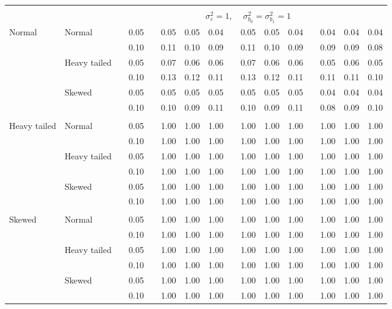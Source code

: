 \begin{table}[ht]
\begin{scriptsize}
\begin{tabular}{ll p{.1cm} c p{.1cm} rrr p{.1cm} rrr p{.1cm} rrr}
&&&&&&&&&&&&&&&\\
& && && \multicolumn{9}{c}{$\sigma_{\varepsilon}^2 = 1$, \ \ $\sigma_{b_0}^2 = \sigma_{b_1}^2 = 1$} \\ \cline{6-16}

\rowcolor{gray!20} Normal       & Normal       && 0.05 &&  0.05 & 0.05 & 0.04 && 0.05 & 0.05 & 0.04 && 0.04 & 0.04 & 0.04 \\ 
\rowcolor{gray!20}              &              && 0.10 &&  0.11 & 0.10 & 0.09 && 0.11 & 0.10 & 0.09 && 0.09 & 0.09 & 0.08 \\ 
\rowcolor{gray!20}              & Heavy tailed && 0.05 &&  0.07 & 0.06 & 0.06 && 0.07 & 0.06 & 0.06 && 0.05 & 0.06 & 0.05 \\ 
\rowcolor{gray!20}              &              && 0.10 &&  0.13 & 0.12 & 0.11 && 0.13 & 0.12 & 0.11 && 0.11 & 0.11 & 0.10 \\ 
\rowcolor{gray!20}              & Skewed       && 0.05 &&  0.05 & 0.05 & 0.05 && 0.05 & 0.05 & 0.05 && 0.04 & 0.04 & 0.04 \\ 
\rowcolor{gray!20}              &              && 0.10 &&  0.10 & 0.09 & 0.11 && 0.10 & 0.09 & 0.11 && 0.08 & 0.09 & 0.10 \\ 
              &&&&&&&&&&&&&&&\\
 Heavy tailed & Normal       && 0.05 &&  1.00 & 1.00 & 1.00 && 1.00 & 1.00 & 1.00 && 1.00 & 1.00 & 1.00 \\ 
              &              && 0.10 &&  1.00 & 1.00 & 1.00 && 1.00 & 1.00 & 1.00 && 1.00 & 1.00 & 1.00 \\ 
              & Heavy tailed && 0.05 &&  1.00 & 1.00 & 1.00 && 1.00 & 1.00 & 1.00 && 1.00 & 1.00 & 1.00 \\ 
              &              && 0.10 &&  1.00 & 1.00 & 1.00 && 1.00 & 1.00 & 1.00 && 1.00 & 1.00 & 1.00 \\ 
              & Skewed       && 0.05 &&  1.00 & 1.00 & 1.00 && 1.00 & 1.00 & 1.00 && 1.00 & 1.00 & 1.00 \\ 
              &              && 0.10 &&  1.00 & 1.00 & 1.00 && 1.00 & 1.00 & 1.00 && 1.00 & 1.00 & 1.00 \\ 
              &&&&&&&&&&&&&&&\\
 Skewed       & Normal       && 0.05 &&  1.00 & 1.00 & 1.00 && 1.00 & 1.00 & 1.00 && 1.00 & 1.00 & 1.00 \\ 
              &              && 0.10 &&  1.00 & 1.00 & 1.00 && 1.00 & 1.00 & 1.00 && 1.00 & 1.00 & 1.00 \\ 
              & Heavy tailed && 0.05 &&  1.00 & 1.00 & 1.00 && 1.00 & 1.00 & 1.00 && 1.00 & 1.00 & 1.00 \\ 
              &              && 0.10 &&  1.00 & 1.00 & 1.00 && 1.00 & 1.00 & 1.00 && 1.00 & 1.00 & 1.00 \\ 
              & Skewed       && 0.05 &&  1.00 & 1.00 & 1.00 && 1.00 & 1.00 & 1.00 && 1.00 & 1.00 & 1.00 \\ 
              &              && 0.10 &&  1.00 & 1.00 & 1.00 && 1.00 & 1.00 & 1.00 && 1.00 & 1.00 & 1.00 \\ 


\end{tabular}
\end{scriptsize}
\end{table}
